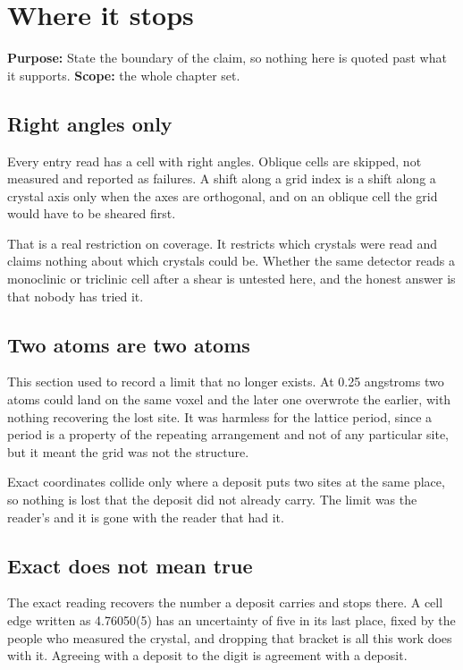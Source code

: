 \chapter{Where it stops}

\textbf{Purpose:} State the boundary of the claim, so nothing here is quoted past what it supports.
\textbf{Scope:} the whole chapter set.

\section{Right angles only}

Every entry read has a cell with right angles. Oblique cells are skipped, not measured and reported as failures. A shift along a grid index is a shift along a crystal axis only when the axes are orthogonal, and on an oblique cell the grid would have to be sheared first.

That is a real restriction on coverage. It restricts which crystals were read and claims nothing about which crystals could be. Whether the same detector reads a monoclinic or triclinic cell after a shear is untested here, and the honest answer is that nobody has tried it.

\section{Two atoms are two atoms}

This section used to record a limit that no longer exists. At 0.25 angstroms two atoms could land on the same voxel and the later one overwrote the earlier, with nothing recovering the lost site. It was harmless for the lattice period, since a period is a property of the repeating arrangement and not of any particular site, but it meant the grid was not the structure.

Exact coordinates collide only where a deposit puts two sites at the same place, so nothing is lost that the deposit did not already carry. The limit was the reader's and it is gone with the reader that had it.

\section{Exact does not mean true}

The exact reading recovers the number a deposit carries and stops there. A cell edge written as 4.76050(5) has an uncertainty of five in its last place, fixed by the people who measured the crystal, and dropping that bracket is all this work does with it. Agreeing with a deposit to the digit is agreement with a deposit.

